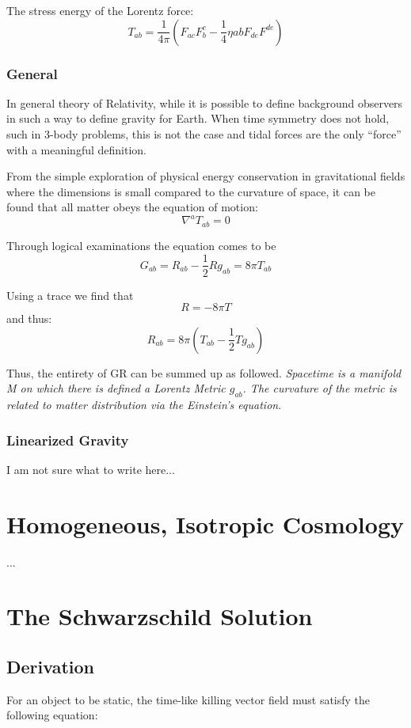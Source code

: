 The stress energy of the Lorentz force:
\[
T_{ab}= \frac{1}{4 \pi} \left( F_{ac}F_b^c - \frac{1}{4}\eta{ab}F_{de}F^{de}   \right)
\]

\subsubsection{General}

In general theory of Relativity, while it is possible to define background observers in such a way to define gravity for Earth. When time symmetry does not hold, such in 3-body problems, this is not the case and tidal forces are the only ``force'' with a meaningful definition.

From the simple exploration of physical energy conservation in gravitational fields where the dimensions is small compared to the curvature of space, it can be found that all matter obeys the equation of motion:
\[
\nabla^a T_{ab}=0
\]

Through logical examinations the equation comes to be
\[
G_{ab}=R_{ab}-\frac{1}{2}Rg_{ab}=8 \pi T_{ab}
  \]

  Using a trace we find that
\[
R= - 8 \pi T
  \]
  and thus:
\[
R_{ab}= 8 \pi \left(T_{ab} - \frac{1}{2} T g_{ab}   \right)
  \]


  Thus, the entirety of GR can be summed up as followed. \emph{Spacetime is a manifold M on which there is defined a Lorentz Metric $g_{ab}$. The curvature of the metric is related to matter distribution via the Einstein's equation}.

\subsubsection{Linearized Gravity}

I am not sure what to write here...

\section{Homogeneous, Isotropic Cosmology}
...

\section{The Schwarzschild Solution}
\subsection{Derivation}
For an object to be static, the time-like killing vector field must satisfy the following equation:

